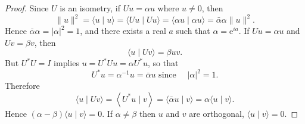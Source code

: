 \documentclass[hyperref,UTF8]{ctexbook}
\begin{document}
\begin{proof}
Since \(U\) is an isometry, if \(U u=\alpha u\) where \(u \neq 0\), then
\[
\|u\|^{2}=\langle u \mid u\rangle=\langle U u \mid U u\rangle=\langle\alpha u \mid \alpha u\rangle=\bar{\alpha} \alpha\|u\|^{2} .
\]
Hence \(\bar{\alpha} \alpha=|\alpha|^{2}=1\), and there exists a real \(a\) such that \(\alpha=\mathrm{e}^{i a}\).
If \(U u=\alpha u\) and \(U v=\beta v\), then
\[
\langle u \mid U v\rangle=\beta u v .
\]
But \(U^{*} U=I\) implies \(u=U^{*} U u=\alpha U^{*} u\), so that
\[
U^{*} u=\alpha^{-1} u=\bar{\alpha} u \text { since } \quad|\alpha|^{2}=1 .
\]
Therefore
\[
\langle u \mid U v\rangle=\left\langle U^{*} u \mid v\right\rangle=\langle\bar{\alpha} u \mid v\rangle=\alpha\langle u \mid v\rangle .
\]
Hence \((\alpha-\beta)\langle u \mid v\rangle=0\). If \(\alpha \neq \beta\) then \(u\) and \(v\) are orthogonal, \(\langle u \mid v\rangle=0\).
\end{proof}
\end{document}
